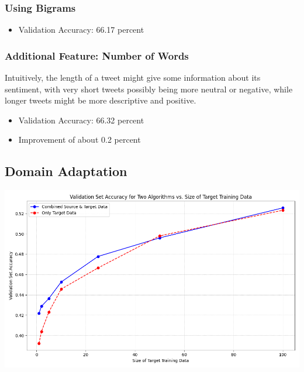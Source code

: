 \documentclass[12pt,a4paper]{article}
\begin{document}
\subsubsection{Using Bigrams}
\begin{itemize}
    \item Validation Accuracy: 66.17 percent
\end{itemize}

\subsubsection{Additional Feature: Number of Words}
Intuitively, the length of a tweet might give some information about its sentiment, with very short tweets possibly being more neutral or negative, while longer tweets might be more descriptive and positive.
\begin{itemize}
    \item Validation Accuracy: 66.32 percent
    \item Improvement of about 0.2 percent
\end{itemize}

\subsection{Domain Adaptation}
\includegraphics[width=\textwidth]{Assignment 2/q1/Domain adaptation validation_accuracies plot.png}
\end{document}
